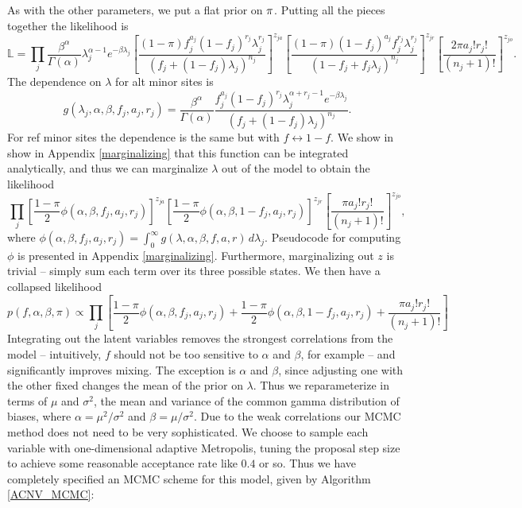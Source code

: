 \documentclass[nofootinbib,amssymb,amsmath]{revtex4}
\begin{document}
As with the other parameters, we put a flat prior on ${\rm \pi}$.  Putting all the pieces together the likelihood is
\begin{equation}
\mathbb{L} =\prod_j \frac{\beta^\alpha}{\Gamma(\alpha)} \lambda_j^{\alpha - 1} e^{-\beta \lambda_j}
\left[ \frac{(1-\pi) f_j^{a_j} (1 - f_j)^{r_j} \lambda_j^{r_j}}{ \left( f_j + (1-f_j) \lambda_j \right)^{n_j}} \right]^{z_{ja}}   
\left[ \frac{(1-\pi) (1-f_j)^{a_j} f_j^{r_j} \lambda_j^{r_j}}{ \left( 1 - f_j + f_j \lambda_j \right)^{n_j}} \right]^{z_{jr}}   
\left[ \frac{2 \pi a_j! r_j!}{(n_j + 1)!} \right]^{z_{jo}}.
\label{ACNVlikelihood}
\end{equation}
%
The dependence on $\lambda$ for alt minor sites is
%
\begin{equation}
g(\lambda_j, \alpha, \beta, f_j, a_j, r_j) = \frac{\beta^\alpha}{\Gamma(\alpha)}  \frac{ f_j^{a_j} (1 - f_j)^{r_j}  \lambda_j^{\alpha + r_j - 1} e^{-\beta \lambda_j}}{ \left( f_j + (1-f_j) \lambda_j \right)^{n_j}}.
\end{equation}
For ref minor sites the dependence is the same but with $f \leftrightarrow 1 - f$.  We show in show in Appendix \ref{marginalizing} that this function can be integrated analytically, and thus we can marginalize $\lambda$ out of the model to obtain the likelihood
%
\begin{equation}
\prod_j 
\left[ \frac{1-\pi}{2} \phi(\alpha, \beta, f_j, a_j, r_j)  \right]^{z_{ja}}   
\left[ \frac{1-\pi}{2} \phi(\alpha, \beta, 1 - f_j, a_j, r_j)  \right]^{z_{jr}}   
\left[ \frac{ \pi a_j! r_j!}{(n_j + 1)!}  \right]^{z_{jo}},
\label{marginalized}
\end{equation}
%
where $\phi(\alpha, \beta, f_j, a_j, r_j) = \int_0^\infty g(\lambda, \alpha, \beta, f, a, r) \, d \lambda_j$.  Pseudocode for computing $\phi$ is presented in Appendix \ref{marginalizing}.  Furthermore, marginalizing out $z$ is trivial -- simply sum each term over its three possible states.  We then have a collapsed likelihood
%
\begin{equation}
p(f,\alpha, \beta, \pi) \propto \prod_j 
\left[    \frac{1-\pi}{2} \phi(\alpha, \beta, f_j, a_j, r_j)  +
\frac{1-\pi}{2} \phi(\alpha, \beta, 1 - f_j, a_j, r_j)  +
 \frac{ \pi a_j! r_j!}{(n_j + 1)!}    \right]
 \label{collapsed}
\end{equation}
%
Integrating out the latent variables removes the strongest correlations from the model -- intuitively, $f$ should not be too sensitive to $\alpha$ and $\beta$, for example -- and significantly improves mixing.  The exception is $\alpha$ and $\beta$, since adjusting one with the other fixed changes the mean of the prior on $\lambda$.  Thus we reparameterize in terms of $\mu$ and $\sigma^2$, the mean and variance of the common gamma distribution of biases, where $\alpha = \mu^2 / \sigma^2$ and $\beta = \mu / \sigma^2$.  Due to the weak correlations our MCMC method does not need to be very sophisticated.  We choose to sample each variable with one-dimensional adaptive Metropolis, tuning the proposal step size to achieve some reasonable acceptance rate like $0.4$ or so.  Thus we have completely specified an MCMC scheme for this model, given by Algorithm \ref{ACNV_MCMC}:
\end{document}
